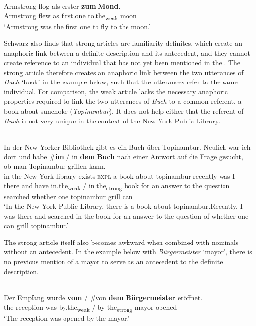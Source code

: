 \documentclass[output=paper,modfonts,nonflat]{langsci/langscibook}
\begin{document}
\ea \label{ex:cisneros:9}
 \\
\gll
Armstrong flog als erster \textbf{zum} \textbf{Mond}.\\
Armstrong flew as first.one to.the\textsubscript{weak} moon\\
\glt
`Armstrong was the first one to fly to the moon.'
\z 

Schwarz also finds that strong articles are familiarity definites, which create an anaphoric link between a definite description and its antecedent, and they cannot create reference to an individual that has not yet been mentioned in the .  The strong article therefore creates an anaphoric link between the two utterances of \textit{Buch} `book' in the example below, such that the utterances refer to the same individual.  For comparison, the weak article lacks the necessary anaphoric properties required to link the two utterances of \textit{Buch} to a common referent, a book about sunchoke (\textit{Topinambur}). It does not help either that the referent of \textit{Buch} is not very unique in the context of the New York Public Library. 

\ea \label{ex:cisneros:10}
 \\
\gll
In der New Yorker Bibliothek gibt es ein Buch \"uber Topinambur.  Neulich war ich dort und habe \textnormal{\#}\textbf{im} \textnormal{/} in \textbf{dem} \textbf{Buch} nach einer Antwort auf die Frage gesucht, ob man Topinambur grillen kann.\\
in the New York library exists \textsc{expl} a book about topinambur recently was I there and have \phantom{\#}in.the\textsubscript{weak} / in the\textsubscript{strong} book for an answer to the question searched whether one topinambur grill can\\
\glt
`In the New York Public Library, there is a book about topinambur.\largerpage[2]  Recently, I was there and searched in the book for an answer to the question of whether one can grill topinambur.'
\z 

The strong article itself also becomes awkward when combined with nominals without an antecedent.  In the example below with \textit{B\"urgermeister} `mayor', there is no previous mention of a mayor to serve as an antecedent to the definite description.

\ea \label{ex:cisneros:11}
 \\
\gll
Der Empfang wurde \textbf{vom} \textnormal{/} \textnormal{\#}von \textbf{dem} \textbf{B\"urgermeister} er\"offnet.\\
the reception was by.the\textsubscript{weak} / \phantom{\#}by the\textsubscript{strong} mayor opened\\
\glt
`The reception was opened by the mayor.'
\z 
\end{document}
